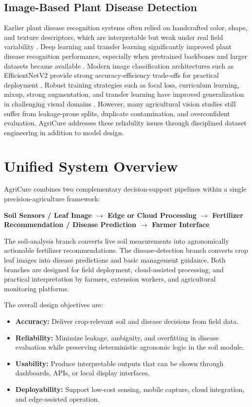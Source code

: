 \documentclass[conference]{IEEEtran}
\begin{document}
\subsection{Image-Based Plant Disease Detection}
Earlier plant disease recognition systems often relied on handcrafted color, shape, and texture descriptors, which are interpretable but weak under real field variability \cite{b17,b20}. Deep learning and transfer learning significantly improved plant disease recognition performance, especially when pretrained backbones and larger datasets became available \cite{b18,b19,b21,b22}. Modern image classification architectures such as EfficientNetV2 provide strong accuracy-efficiency trade-offs for practical deployment \cite{b13}. Robust training strategies such as focal loss, curriculum learning, mixup, strong augmentation, and transfer learning have improved generalization in challenging visual domains \cite{b14,b15,b16,b23,b24}. However, many agricultural vision studies still suffer from leakage-prone splits, duplicate contamination, and overconfident evaluation. AgriCure addresses these reliability issues through disciplined dataset engineering in addition to model design.

\section{Unified System Overview}
AgriCure combines two complementary decision-support pipelines within a single precision-agriculture framework:
\begin{center}
\textbf{Soil Sensors / Leaf Image $\rightarrow$ Edge or Cloud Processing $\rightarrow$ Fertilizer Recommendation / Disease Prediction $\rightarrow$ Farmer Interface}
\end{center}

The soil-analysis branch converts live soil measurements into agronomically actionable fertilizer recommendations. The disease-detection branch converts crop leaf images into disease predictions and basic management guidance. Both branches are designed for field deployment, cloud-assisted processing, and practical interpretation by farmers, extension workers, and agricultural monitoring platforms.

The overall design objectives are:
\begin{itemize}
\item \textbf{Accuracy:} Deliver crop-relevant soil and disease decisions from field data.
\item \textbf{Reliability:} Minimize leakage, ambiguity, and overfitting in disease evaluation while preserving deterministic agronomic logic in the soil module.
\item \textbf{Usability:} Produce interpretable outputs that can be shown through dashboards, APIs, or local display interfaces.
\item \textbf{Deployability:} Support low-cost sensing, mobile capture, cloud integration, and edge-assisted operation.
\end{itemize}
\end{document}
